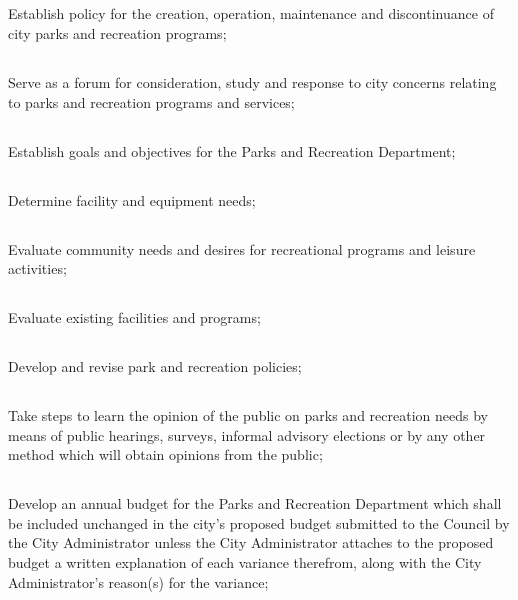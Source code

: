 \subsection{}
Establish policy for the creation, operation, maintenance and discontinuance of city parks and recreation programs;
\subsection{}
Serve as a forum for consideration, study and response to city concerns relating to parks and recreation programs and services;
\subsection{}
Establish goals and objectives for the Parks and Recreation Department;
\subsection{}
Determine facility and equipment needs;
\subsection{}
Evaluate community needs and desires for recreational programs and leisure activities;
\subsection{}
Evaluate existing facilities and programs;
\subsection{}
Develop and revise park and recreation policies;
\subsection{}
Take steps to learn the opinion of the public on parks and recreation needs by means of public hearings, surveys, informal advisory elections or by any other method which will obtain opinions from the public;
\subsection{}
Develop an annual budget for the Parks and Recreation Department which shall be included unchanged in the city’s proposed budget submitted to the Council by the City Administrator unless the City Administrator attaches to the proposed budget a written explanation of each variance therefrom, along with the City Administrator’s reason(s) for the variance;
